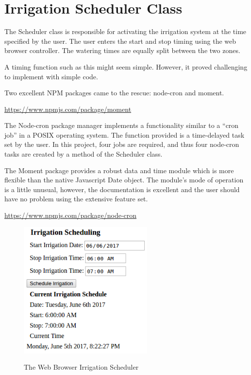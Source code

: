 \chapter{Irrigation Scheduler Class}

The Scheduler class is responsible for activating the irrigation system at the 
time specified by the user.  The user enters the start and stop timing using 
the web browser controller.  The watering times are equally split between the 
two zones.

A timing function such as this might seem simple.  However, it proved 
challenging to implement with simple code.

Two excellent NPM packages came to the rescue: node-cron and moment.

\url{https://www.npmjs.com/package/moment}

The Node-cron package manager implements a functionality similar to a ``cron 
job'' in a POSIX operating system.  The function provided is a time-delayed 
task set by the user.  In this project, four jobs are required, and thus four 
node-cron tasks are created by a method of the Scheduler class.

The Moment package provides a robust data and time module which is more 
flexible than the native Javascript Date object.  The module's mode of 
operation is a little unusual, however, the documentation is excellent and the 
user should have no problem using the extensive feature set.

\url{https://www.npmjs.com/package/node-cron}

\begin{figure}[H]
	\centering
	\includegraphics[width=0.6\textwidth]{photos/scheduler.png}
	\centering\bfseries
	\caption{The Web Browser Irrigation Scheduler}
\end{figure}

